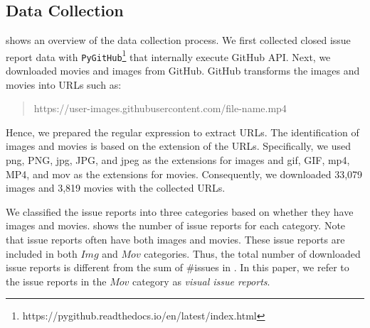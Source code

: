 \subsection{Data Collection}
 shows an overview of 
the data collection process. 
We first collected closed issue report data with \texttt{PyGitHub}\footnote{https://pygithub.readthedocs.io/en/latest/index.html}
that internally execute GitHub API. 
Next, we downloaded movies and images from GitHub.
GitHub transforms the images and movies into URLs such as:
\begin{quote}
	https://user-images.githubusercontent.com/file-name.mp4
	\\
\end{quote}
Hence, we prepared the regular expression 
to extract URLs. 
The identification of images and movies is based on the extension of 
the URLs. 
Specifically, we used png, PNG, jpg, JPG, and jpeg as 
the extensions for images and 
gif, GIF, mp4, MP4, and mov as the extensions for movies.
Consequently, we downloaded 33,079 images and 3,819 movies
with the collected URLs. 

We classified the issue reports into three categories based on 
whether they have images and movies. 
 shows the number of issue reports for each category. 
Note that issue reports often have both images and movies. 
These issue reports are included in both $Img$ and $Mov$ categories. 
Thus, the total number of downloaded issue reports is different from 
the sum of \#issues in . 
In this paper, we refer to the issue reports in the $Mov$ category 
as \textit{visual issue reports}. 



% 

